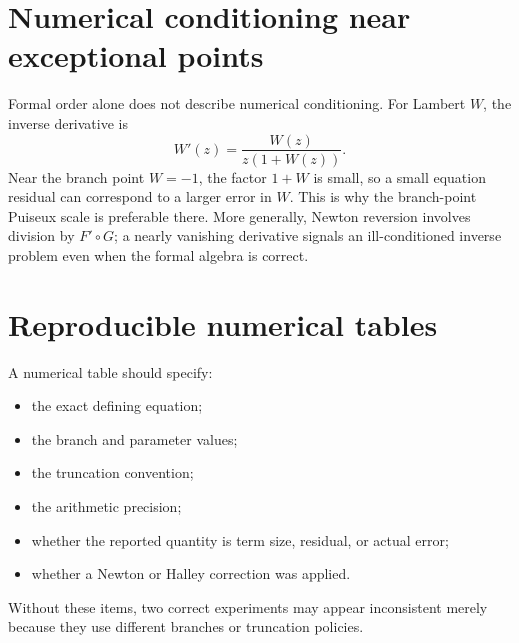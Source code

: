 \documentclass[11pt,openany]{book}
\theoremstyle{definition}
\theoremstyle{plain}
\theoremstyle{remark}
\begin{document}
\section{Numerical conditioning near exceptional points}
Formal order alone does not describe numerical conditioning. For Lambert \(W\), the inverse derivative is
\[
 W'(z)=\frac{W(z)}{z(1+W(z))}.
\]
Near the branch point \(W=-1\), the factor \(1+W\) is small, so a small equation residual can correspond to a larger error in \(W\). This is why the branch-point Puiseux scale is preferable there. More generally, Newton reversion involves division by \(F'\circ G\); a nearly vanishing derivative signals an ill-conditioned inverse problem even when the formal algebra is correct.

\section{Reproducible numerical tables}
A numerical table should specify:
\begin{itemize}
\item the exact defining equation;
\item the branch and parameter values;
\item the truncation convention;
\item the arithmetic precision;
\item whether the reported quantity is term size, residual, or actual error;
\item whether a Newton or Halley correction was applied.
\end{itemize}
Without these items, two correct experiments may appear inconsistent merely because they use different branches or truncation policies.
\end{document}
